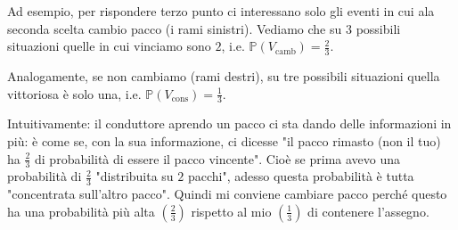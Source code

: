 \begin{tikzpicture}[x=0.75pt,y=0.75pt,yscale=-1,xscale=1]
\end{tikzpicture}

Ad esempio, per rispondere terzo punto ci interessano solo gli eventi in cui ala seconda scelta cambio pacco (i rami sinistri). Vediamo che su $3$ possibili situazioni quelle in cui vinciamo sono $2$, i.e. $\mathbb{P}( V_{\text{camb}}) =\frac{2}{3}$.

Analogamente, se non cambiamo (rami destri), su tre possibili situazioni quella vittoriosa è solo una, i.e. $\mathbb{P}( V_{\text{cons}}) =\frac{1}{3}$.
\begin{oss}
Intuitivamente: il conduttore aprendo un pacco ci sta dando delle informazioni in più: è come se, con la sua informazione, ci dicesse "il pacco rimasto (non il tuo) ha $\frac{2}{3}$ di probabilità di essere il pacco vincente". Cioè se prima avevo una probabilità di $\frac{2}{3}$ "distribuita su $2$ pacchi", adesso questa probabilità è tutta "concentrata sull'altro pacco". Quindi mi conviene cambiare pacco perché questo ha una probabilità più alta $\left(\frac{2}{3}\right)$ rispetto al mio $\left(\frac{1}{3}\right)$ di contenere l'assegno.


 
\tikzset{
pattern size/.store in=\mcSize, 
pattern size = 5pt,
pattern thickness/.store in=\mcThickness, 
pattern thickness = 0.3pt,
pattern radius/.store in=\mcRadius, 
pattern radius = 1pt}
\makeatletter
{}
\makeatother
{} %

\begin{tikzpicture}[x=0.75pt,y=0.75pt,yscale=-1,xscale=1]


\end{tikzpicture}
\end{oss}
